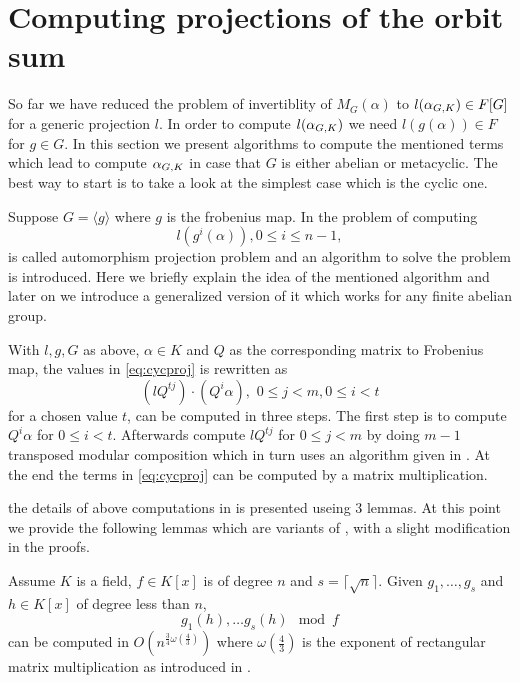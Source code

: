 \section{Computing projections of the orbit sum}\label{sec:osum}

So far we have reduced the problem of invertiblity of $M_G(\alpha)$ to $l(\alpha_{G,K}) \in F[G]$ for a generic
projection $l$. In order to compute $l(\alpha_{G,K})$ we need $l(g(\alpha)) \in F$ for $g \in G$. In this section we present 
algorithms to compute the mentioned terms which lead to compute $\alpha_{G,K}$ in case that $G$ is either abelian or metacyclic. 
The best way to start is to take a look at the simplest case which is the cyclic one. 

Suppose $G = \langle g \rangle$
where $g$ is the frobenius map. In \cite{Kaltofen} the problem of
computing 
\begin{equation}\label{eq:cycproj}
l(g^i(\alpha)), 0 \leq i \leq n-1,
\end{equation}
is called automorphism projection problem and an algorithm to solve 
the problem is introduced. Here we briefly explain the idea of the mentioned algorithm and later on we introduce a
generalized version of it which works for any finite abelian group.

With $l,g,G$ as above, $\alpha \in K$ and $Q$ as the corresponding matrix to Frobenius map, the values in \eqref{eq:cycproj} is rewritten as
$$(lQ^{tj})\cdot(Q^i\alpha), \,\, 0 \leq j <m, 0 \leq i <t$$
 for a chosen value $t$, can be computed in three steps. The first step is to compute $Q^i\alpha$ for $0 \leq i <t$. Afterwards
 compute $lQ^{tj}$ for $0 \leq j <m$ by doing $m-1$ transposed modular composition which in turn uses an algorithm given
 in \cite{Shoup}. At the end the terms in \eqref{eq:cycproj} can be computed by a matrix multiplication.
 
the details of above computations in \cite{Kaltofen} is presented useing 3 lemmas. At this point we provide the following 
lemmas which are variants of \cite[Lemma 3, Lemma 4 $\&$ Lemma 8]{Kaltofen}, with a slight modification in the proofs.

\begin{lemma}\cite{Kaltofen}\label{lem:modcom}
Assume $K$ is a field, $f\in K[x]$ is of degree $n$ and $s = \lceil\sqrt{n}\rceil$. Given $g_1, \ldots , g_{s}$ and 
$h \in K[x]$ of degree less than $n$, $$g_1(h), \ldots g_{s}(h) \mod f$$ can be computed in
$O(n^{\frac{3}{4}\omega(\frac{4}{3})})$ where $\omega(\frac{4}{3})$ is the exponent of rectangular matrix 
multiplication as introduced in \cite{LeGall}. 
\end{lemma}

